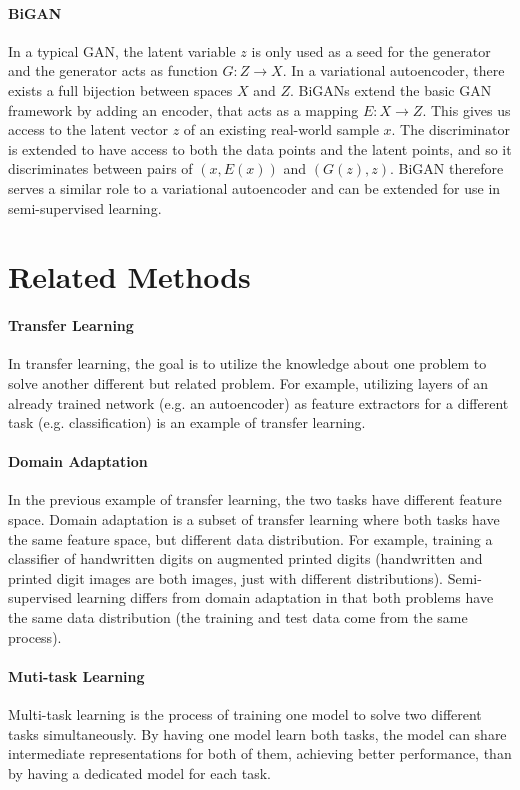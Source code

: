 \paragraph*{BiGAN}
In a typical GAN, the latent variable $z$ is only used as a seed for the generator and the generator acts as function $G: Z \rightarrow X$. In a variational autoencoder, there exists a full bijection between spaces $X$ and $Z$. BiGANs extend the basic GAN framework by adding an encoder, that acts as a mapping $E: X \rightarrow Z$. This gives us access to the latent vector $z$ of an existing real-world sample $x$. The discriminator is extended to have access to both the data points and the latent points, and so it discriminates between pairs of $(x, E(x))$ and $(G(z), z)$. BiGAN therefore serves a similar role to a variational autoencoder and can be extended for use in semi-supervised learning.


\section{Related Methods}
\label{sec:RelatedSslMethods}

\paragraph*{Transfer Learning} In transfer learning, the goal is to utilize the knowledge about one problem to solve another different but related problem. For example, utilizing layers of an already trained network (e.g. an autoencoder) as feature extractors for a different task (e.g. classification) is an example of transfer learning.

\paragraph*{Domain Adaptation} In the previous example of transfer learning, the two tasks have different feature space. Domain adaptation is a subset of transfer learning where both tasks have the same feature space, but different data distribution. For example, training a classifier of handwritten digits on augmented printed digits (handwritten and printed digit images are both images, just with different distributions). Semi-supervised learning differs from domain adaptation in that both problems have the same data distribution (the training and test data come from the same process).

\paragraph*{Muti-task Learning} Multi-task learning is the process of training one model to solve two different tasks simultaneously. By having one model learn both tasks, the model can share intermediate representations for both of them, achieving better performance, than by having a dedicated model for each task.
